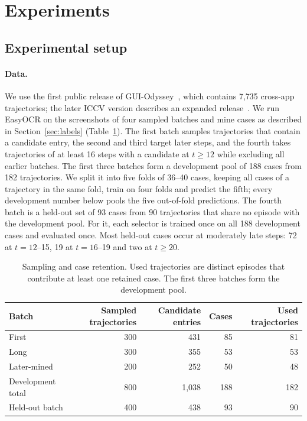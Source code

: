 \section{Experiments}
\subsection{Experimental setup}
\label{sec:setup}
\paragraph{Data.} We use the first public release of GUI-Odyssey~\citep{odysseyv1}, which contains 7,735 cross-app trajectories; the later ICCV version describes an expanded release~\citep{odysseypub}. We run EasyOCR on the screenshots of four sampled batches and mine cases as described in Section~\ref{sec:labels} (Table~\ref{tab:data}). The first batch samples trajectories that contain a candidate entry, the second and third target later steps, and the fourth takes trajectories of at least 16 steps with a candidate at $t\geq12$ while excluding all earlier batches. The first three batches form a development pool of 188 cases from 182 trajectories. We split it into five folds of 36--40 cases, keeping all cases of a trajectory in the same fold, train on four folds and predict the fifth; every development number below pools the five out-of-fold predictions. The fourth batch is a held-out set of 93 cases from 90 trajectories that share no episode with the development pool. For it, each selector is trained once on all 188 development cases and evaluated once. Most held-out cases occur at moderately late steps: 72 at $t=12$--15, 19 at $t=16$--19 and two at $t\geq20$.

\begin{table}[!htb]\centering
\caption{Sampling and case retention. Used trajectories are distinct episodes that contribute at least one retained case. The first three batches form the development pool.}
\label{tab:data}\small
\begin{tabular}{lrrrr}\toprule
Batch & Sampled trajectories & Candidate entries & Cases & Used trajectories\\\midrule
First & 300 & 431 & 85 & 81\\
Long & 300 & 355 & 53 & 53\\
Later-mined & 200 & 252 & 50 & 48\\\midrule
Development total & 800 & 1,038 & 188 & 182\\
Held-out batch & 400 & 438 & 93 & 90\\\bottomrule
\end{tabular}\end{table}

